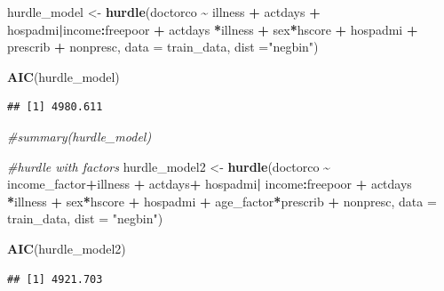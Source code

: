 \documentclass[
]{article}
\newenvironment{Shaded}{\begin{snugshade}}{\end{snugshade}}
\newcommand{\AttributeTok}[1]{\textcolor[rgb]{0.13,0.29,0.53}{#1}}
\newcommand{\CommentTok}[1]{\textcolor[rgb]{0.56,0.35,0.01}{\textit{#1}}}
\newcommand{\FunctionTok}[1]{\textcolor[rgb]{0.13,0.29,0.53}{\textbf{#1}}}
\newcommand{\NormalTok}[1]{#1}
\newcommand{\OtherTok}[1]{\textcolor[rgb]{0.56,0.35,0.01}{#1}}
\newcommand{\SpecialCharTok}[1]{\textcolor[rgb]{0.81,0.36,0.00}{\textbf{#1}}}
\newcommand{\StringTok}[1]{\textcolor[rgb]{0.31,0.60,0.02}{#1}}
\begin{document}
\begin{Shaded}
\begin{Highlighting}[]
\NormalTok{hurdle\_model }\OtherTok{\textless{}{-}} \FunctionTok{hurdle}\NormalTok{(doctorco }\SpecialCharTok{\textasciitilde{}}\NormalTok{ illness }\SpecialCharTok{+}\NormalTok{ actdays }\SpecialCharTok{+}\NormalTok{ hospadmi}\SpecialCharTok{|}\NormalTok{income}\SpecialCharTok{:}\NormalTok{freepoor }\SpecialCharTok{+} 
\NormalTok{                         actdays }\SpecialCharTok{*}\NormalTok{illness }\SpecialCharTok{+}\NormalTok{ sex}\SpecialCharTok{*}\NormalTok{hscore }\SpecialCharTok{+}\NormalTok{ hospadmi }\SpecialCharTok{+}\NormalTok{ prescrib }\SpecialCharTok{+}\NormalTok{ nonpresc,}
                       \AttributeTok{data =}\NormalTok{ train\_data, }\AttributeTok{dist =}\StringTok{"negbin"}\NormalTok{)}

\FunctionTok{AIC}\NormalTok{(hurdle\_model)}
\end{Highlighting}
\end{Shaded}

\begin{verbatim}
## [1] 4980.611
\end{verbatim}

\begin{Shaded}
\begin{Highlighting}[]
\CommentTok{\#summary(hurdle\_model)}

\CommentTok{\#hurdle with factors}
\NormalTok{hurdle\_model2 }\OtherTok{\textless{}{-}} \FunctionTok{hurdle}\NormalTok{(doctorco }\SpecialCharTok{\textasciitilde{}}\NormalTok{ income\_factor}\SpecialCharTok{+}\NormalTok{illness }\SpecialCharTok{+}\NormalTok{  actdays}\SpecialCharTok{+}\NormalTok{ hospadmi}\SpecialCharTok{|}
\NormalTok{                          income}\SpecialCharTok{:}\NormalTok{freepoor }\SpecialCharTok{+}\NormalTok{ actdays }\SpecialCharTok{*}\NormalTok{illness }\SpecialCharTok{+}\NormalTok{ sex}\SpecialCharTok{*}\NormalTok{hscore }\SpecialCharTok{+}\NormalTok{ hospadmi }\SpecialCharTok{+}
\NormalTok{                          age\_factor}\SpecialCharTok{*}\NormalTok{prescrib }\SpecialCharTok{+}\NormalTok{ nonpresc,}
                        \AttributeTok{data =}\NormalTok{ train\_data, }\AttributeTok{dist =} \StringTok{"negbin"}\NormalTok{)}

\FunctionTok{AIC}\NormalTok{(hurdle\_model2)}
\end{Highlighting}
\end{Shaded}

\begin{verbatim}
## [1] 4921.703
\end{verbatim}
\end{document}
